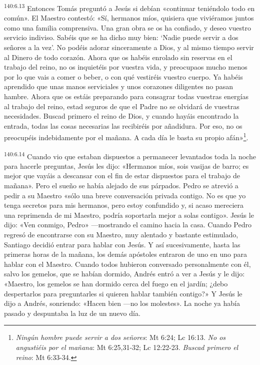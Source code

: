\par
\textsuperscript{140:6.13} Entonces Tomás preguntó a Jesús si debían «continuar teniéndolo todo en común». El Maestro contestó: «Sí, hermanos míos, quisiera que viviéramos juntos como una familia comprensiva. Una gran obra se os ha confiado, y deseo vuestro servicio indiviso. Sabéis que se ha dicho muy bien: `Nadie puede servir a dos señores a la vez'. No podéis adorar sinceramente a Dios, y al mismo tiempo servir al Dinero de todo corazón. Ahora que os habéis enrolado sin reservas en el trabajo del reino, no os inquietéis por vuestra vida, y preocupaos mucho menos por lo que vais a comer o beber, o con qué vestiréis vuestro cuerpo. Ya habéis aprendido que unas manos serviciales y unos corazones diligentes no pasan hambre. Ahora que os estáis preparando para consagrar todas vuestras energías al trabajo del reino, estad seguros de que el Padre no se olvidará de vuestras necesidades. Buscad primero el reino de Dios, y cuando hayáis encontrado la entrada, todas las cosas necesarias las recibiréis por añadidura. Por eso, no os preocupéis indebidamente por el mañana. A cada día le basta su propio afán»\footnote{\textit{Ningún hombre puede servir a dos señores}: Mt 6:24; Lc 16:13. \textit{No os angustiéis por el mañana}: Mt 6:25,31-32; Lc 12:22-23. \textit{Buscad primero el reino}: Mt 6:33-34.}.

\par
\textsuperscript{140:6.14} Cuando vio que estaban dispuestos a permanecer levantados toda la noche para hacerle preguntas, Jesús les dijo: «Hermanos míos, sois vasijas de barro; es mejor que vayáis a descansar con el fin de estar dispuestos para el trabajo de mañana». Pero el sueño se había alejado de sus párpados. Pedro se atrevió a pedir a su Maestro «sólo una breve conversación privada contigo. No es que yo tenga secretos para mis hermanos, pero estoy confundido y, si acaso mereciera una reprimenda de mi Maestro, podría soportarla mejor a solas contigo». Jesús le dijo: «Ven conmigo, Pedro» ---mostrando el camino hacia la casa. Cuando Pedro regresó de encontrarse con su Maestro, muy alentado y bastante estimulado, Santiago decidió entrar para hablar con Jesús. Y así sucesivamente, hasta las primeras horas de la mañana, los demás apóstoles entraron de uno en uno para hablar con el Maestro. Cuando todos hubieron conversado personalmente con él, salvo los gemelos, que se habían dormido, Andrés entró a ver a Jesús y le dijo: «Maestro, los gemelos se han dormido cerca del fuego en el jardín; ¿debo despertarlos para preguntarles si quieren hablar también contigo?» Y Jesús le dijo a Andrés, sonriendo: «Hacen bien ---no los molestes». La noche ya había pasado y despuntaba la luz de un nuevo día.

